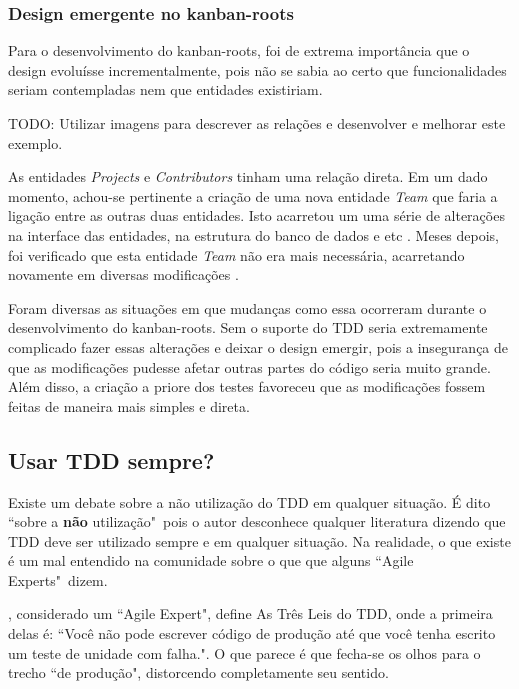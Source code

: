 \subsubsection{Design emergente no kanban-roots} %
\label{ssub:design_emergente_no_kanban_roots}

Para o desenvolvimento do kanban-roots, foi de extrema importância que o design evoluísse incrementalmente, pois não se sabia ao certo que
funcionalidades seriam contempladas nem que entidades existiriam.

TODO: Utilizar imagens para descrever as relações e desenvolver e melhorar este exemplo.

As entidades \textit{Projects} e \textit{Contributors} tinham uma relação direta. Em um dado momento, achou-se pertinente a criação de uma nova entidade \textit{Team} que faria a ligação entre as outras duas entidades. Isto acarretou um uma série de alterações na interface das entidades, na estrutura do banco de dados e etc \cite{CommitAddTeam}. Meses depois, foi verificado que esta entidade \textit{Team} não era mais necessária, acarretando novamente em diversas modificações \cite{CommitRemoveTeam}.

Foram diversas as situações em que mudanças como essa ocorreram durante o desenvolvimento do kanban-roots. Sem o suporte do TDD seria extremamente complicado fazer essas alterações e deixar o design emergir, pois a insegurança de que as modificações pudesse afetar outras partes do código seria muito grande. Além disso, a criação a priore dos testes favoreceu que as modificações fossem feitas de maneira mais simples e direta.



\subsection{Usar TDD sempre?} %
\label{sec:usar_tdd_sempre}

Existe um debate sobre a não utilização do TDD em qualquer situação. É dito ``sobre a \textbf{não} utilização"\ pois o autor desconhece qualquer literatura dizendo que TDD deve ser utilizado sempre e em qualquer situação. Na realidade, o que existe é um mal entendido na comunidade sobre o que que alguns ``Agile Experts"\ dizem.

, considerado um ``Agile Expert", define As Três Leis do TDD, onde a primeira delas é: ``Você não pode escrever código de produção até que você tenha escrito um teste de unidade com falha.". O que parece é que fecha-se os olhos para o trecho ``de produção", distorcendo completamente seu sentido.

